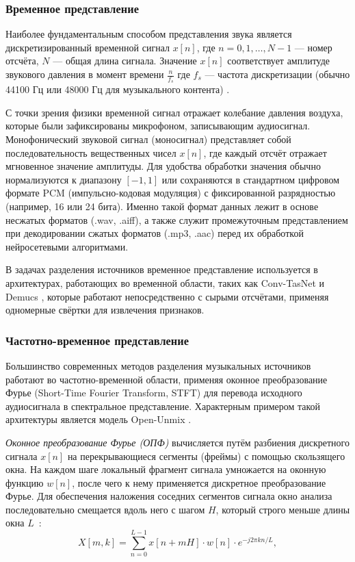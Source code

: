 \documentclass[14pt]{extarticle}
\begin{document}
\subsubsection{Временное представление}
Наиболее фундаментальным способом представления звука является дискретизированный временной сигнал $x[n]$, где $n = 0,1, \dots ,N-1$ 
--- номер отсчёта, $N$ --- общая длина сигнала. Значение $x[n]$ соответствует амплитуде звукового давления в момент времени $\frac{n}{f_s}$
где $f_s$ — частота дискретизации (обычно 44100 Гц или 48000 Гц для музыкального контента) \cite{spectral}.

С точки зрения физики временной сигнал отражает колебание давления воздуха, которые были зафиксированы микрофоном, 
записывающим аудиосигнал. Монофонический звуковой сигнал (моносигнал) представляет собой последовательность вещественных чисел $x[n]$, 
где каждый отсчёт отражает мгновенное значение амплитуды.
Для удобства обработки значения обычно нормализуются к диапазону $[-1,1]$ или сохраняются в стандартном цифровом формате PCM (импульсно-кодовая модуляция) 
с фиксированной разрядностью (например, 16 или 24 бита). Именно такой формат данных лежит в основе несжатых форматов (.wav, .aiff), а также 
служит промежуточным представлением при декодировании сжатых форматов (.mp3, .aac) перед их обработкой нейросетевыми алгоритмами.

В задачах разделения источников временное представление используется в архитектурах, работающих во временной области, таких как 
Conv-TasNet \cite{Conv-TasNet} и Demucs \cite{demucs, waveform_domain}, которые работают непосредственно с сырыми отсчётами, применяя одномерные свёртки 
для извлечения признаков.


\subsubsection{Частотно-временное представление}
Большинство современных методов разделения музыкальных источников работают во частотно-временной области,
применяя оконное преобразование Фурье (Short-Time Fourier Transform, STFT) 
для перевода исходного аудиосигнала в спектральное представление.
Характерным примером такой архитектуры является модель Open-Unmix \cite{openunmix}.

\par\textit{Оконное преобразование Фурье (ОПФ)} вычисляется путём разбиения дискретного сигнала $x[n]$ на перекрывающиеся сегменты (фреймы)
с помощью скользящего окна.
На каждом шаге локальный фрагмент сигнала умножается на оконную функцию $w[n]$, после чего к нему применяется дискретное преобразование
Фурье. Для обеспечения наложения соседних сегментов сигнала окно анализа последовательно смещается вдоль него с шагом $H$, 
который строго меньше длины окна $L$~\cite{stft_2008}:
\begin{equation*}
    X[m, k] = \sum_{n=0}^{L-1} x[n + mH] \cdot w[n] \cdot e^{-j 2\pi k n / L},
    \label{eq:stft}
\end{equation*}
\end{document}
